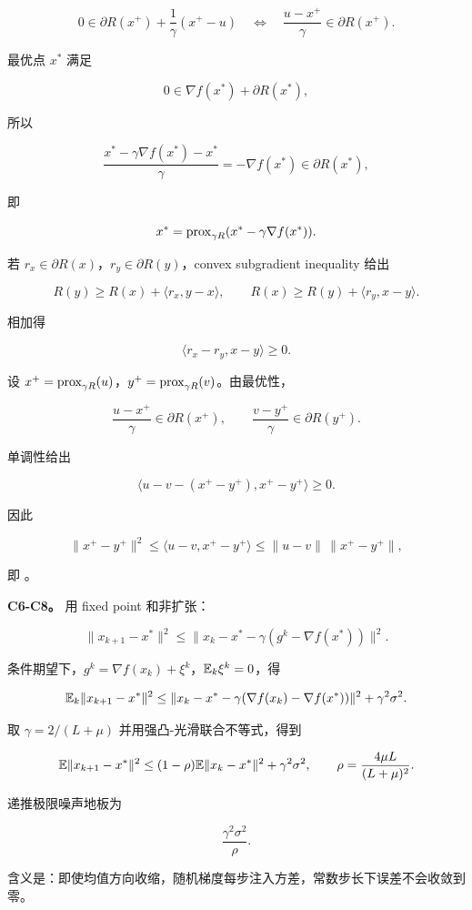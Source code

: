 \[
  0\in \partial R(x^+)+\frac1\gamma(x^+-u)
  \quad\Longleftrightarrow\quad
  \frac{u-x^+}{\gamma}\in\partial R(x^+).
\]

最优点 \(x^*\) 满足

\[
  0\in \nabla f(x^*)+\partial R(x^*),
\]

所以

\[
  \frac{x^*-\gamma\nabla f(x^*)-x^*}{\gamma}
  =
  -\nabla f(x^*)\in\partial R(x^*),
\]

即

\[
  x^*=\operatorname{prox}_{\gamma R}(x^*-\gamma\nabla f(x^*)).
\]

若 \(r_x\in\partial R(x)\)，\(r_y\in\partial R(y)\)，convex subgradient inequality 给出

\[
  R(y)\ge R(x)+\langle r_x,y-x\rangle,
  \qquad
  R(x)\ge R(y)+\langle r_y,x-y\rangle.
\]

相加得

\[
  \langle r_x-r_y,x-y\rangle\ge0.
\]

设 \(x^+=\operatorname{prox}_{\gamma R}(u)\)，\(y^+=\operatorname{prox}_{\gamma R}(v)\)。由最优性，

\[
  \frac{u-x^+}{\gamma}\in\partial R(x^+),
  \qquad
  \frac{v-y^+}{\gamma}\in\partial R(y^+).
\]

单调性给出

\[
  \langle u-v-(x^+-y^+),x^+-y^+\rangle\ge0.
\]

因此

\[
  \|x^+-y^+\|^2\le \langle u-v,x^+-y^+\rangle
  \le \|u-v\|\,\|x^+-y^+\|,
\]

即 。

\textbf{C6-C8。} 用 fixed point 和非扩张：

\[
  \|x_{k+1}-x^*\|^2
  \le
  \|x_k-x^*-\gamma(g^k-\nabla f(x^*))\|^2.
\]

条件期望下，\(g^k=\nabla f(x_k)+\xi^k\)，\(\mathbb{E}_k\xi^k=0\)，得

\[
  \mathbb{E}_k\|x_{k+1}-x^*\|^2
  \le
  \|x_k-x^*-\gamma(\nabla f(x_k)-\nabla f(x^*))\|^2+\gamma^2\sigma^2.
\]

取 \(\gamma=2/(L+\mu)\) 并用强凸-光滑联合不等式，得到

\[
  \mathbb{E}\|x_{k+1}-x^*\|^2
  \le
  (1-\rho)\mathbb{E}\|x_k-x^*\|^2+\gamma^2\sigma^2,
  \qquad
  \rho=\frac{4\mu L}{(L+\mu)^2}.
\]

递推极限噪声地板为

\[
  \frac{\gamma^2\sigma^2}{\rho}.
\]

含义是：即使均值方向收缩，随机梯度每步注入方差，常数步长下误差不会收敛到零。

